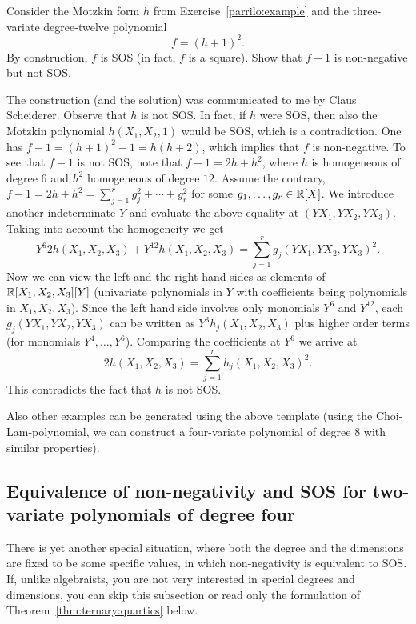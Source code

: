 \begin{exercise}
	Consider the Motzkin form $h$ from Exercise~\ref{parrilo:example} and the three-variate degree-twelve polynomial 
	\[
		f = (h+1)^2.
	\]
	By construction, $f$ is SOS (in fact, $f$ is a square). Show that $f-1$ is non-negative but not SOS. 
\end{exercise}
\begin{solution}
	The construction (and the solution) was communicated to me by Claus Scheiderer. 
	Observe that $h$ is not SOS. In fact, if $h$ were SOS, then also the Motzkin polynomial $h(X_1,X_2,1)$ would be SOS, which is a contradiction. One has $f - 1= (h+1)^2 - 1 = h (h+2)$, which implies that $f$ is non-negative. To see that $f-1$ is not SOS, note that $f- 1= 2 h + h^2$, where $h$ is homogeneous of degree $6$ and $h^2$ homogeneous of degree $12$. Assume the contrary, $f-1 = 2 h + h^2 = \sum_{j=1}^r g_j^2 + \cdots + g_r^2$ for some $g_1,\ldots,g_r \in \mathbb{R}[X]$. We introduce another indeterminate $Y$  and evaluate the above equality at $(Y X_1, Y X_2, Y X_3)$. Taking into account the homogeneity we get
	\[
		Y^6 2 h(X_1,X_2,X_3) + Y^{12} h(X_1,X_2,X_3) = \sum_{j=1}^r g_j(Y X_1, Y X_2, Y X_3)^2. 
	\]
	Now we can view the left and the right hand sides as elements of $\mathbb{R}[X_1,X_2,X_3][Y]$ (univariate polynomials in $Y$ with coefficients being polynomials in $X_1, X_2, X_3$). Since the left hand side involves only monomials $Y^6$ and $Y^{12}$,  each $g_j(Y X_1, Y X_2, Y X_3)$ can be written as $Y^3 h_j(X_1,X_2,X_3)$ plus higher order terms (for monomials $Y^4,\ldots, Y^6$). Comparing the coefficients at $Y^6$ we arrive at 
	\[
		2 h(X_1,X_2,X_3) = \sum_{j=1}^r h_j(X_1,X_2,X_3)^2.
	\]
	This contradicts the fact that $h$ is not SOS.
\end{solution}

Also other examples can be generated using the above template (using the Choi-Lam-polynomial, we can construct a four-variate polynomial of degree $8$ with similar properties).

\subsection{Equivalence of non-negativity and SOS for two-variate polynomials of degree four}

There is yet another special situation, where both the degree and the dimensions are fixed to be some specific values, in which non-negativity is equivalent to SOS. If, unlike algebraists, you are not very interested in special degrees and dimensions, you can skip this subsection or read only the formulation of Theorem~\ref{thm:ternary:quartics} below. 

